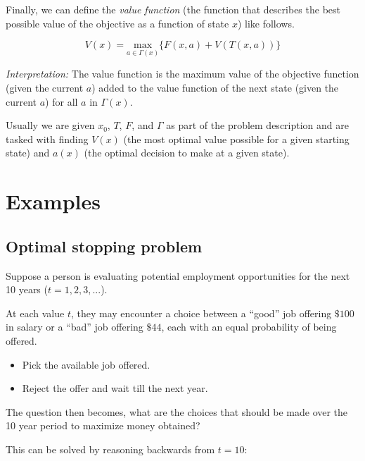 \documentclass[a4paper, 12pt]{article}
\begin{document}
Finally, we can define the \emph{value function} (the function
that describes the best possible value of the objective as a
function of state $x$) like follows.

\[
  V(x) = \underset{a \in \Gamma(x)}{\text{max}}\{F(x, a) + V(T(x, a))\}
\]

\emph{Interpretation:} The value function is the maximum value of
the objective function (given the current $a$) added to the value
function of the next state (given the current $a$) for all $a$ in
$\Gamma(x)$.

Usually we are given $x_0$, $T$, $F$, and $\Gamma$ as part of the
problem description and are tasked with finding $V(x)$ (the most
optimal value possible for a given starting state) and $a(x)$ (the
optimal decision to make at a given state).

\section{Examples}

\subsection{Optimal stopping problem}

Suppose a person is evaluating potential employment opportunities
for the next 10 years ($t = 1, 2, 3, ...$).

At each value $t$, they may encounter a choice between a ``good''
job offering $\$100$ in salary or a ``bad'' job offering $\$44$,
each with an equal probability of being offered.

\begin{itemize}
  \item Pick the available job offered.
  \item Reject the offer and wait till the next year.
\end{itemize}

The question then becomes, what are the choices that should be
made over the 10 year period to maximize money obtained?

This can be solved by reasoning backwards from $t=10$:
\end{document}
